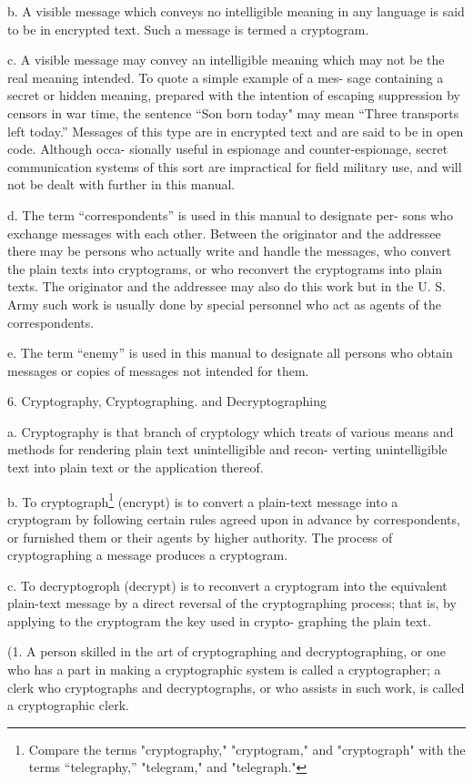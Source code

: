 b. A visible message which conveys no intelligible meaning in any
language is said to be in encrypted text. Such a message is termed a
cryptogram.

c. A visible message may convey an intelligible meaning which may
not be the real meaning intended. To quote a simple example of a mes-
sage containing a secret or hidden meaning, prepared with the intention
of escaping suppression by censors in war time, the sentence “Son born
today" may mean “Three transports left today.” Messages of this type
are in encrypted text and are said to be in open code. Although occa-
sionally useful in espionage and counter-espionage, secret communication
systems of this sort are impractical for ﬁeld military use, and will not
be dealt with further in this manual.

d. The term “correspondents” is used in this manual to designate per-
sons who exchange messages with each other. Between the originator
and the addressee there may be persons who actually write and handle
the messages, who convert the plain texts into cryptograms, or who
reconvert the cryptograms into plain texts. The originator and the
addressee may also do this work but in the U. S. Army such work is
usually done by special personnel who act as agents of the correspondents.

e. The term “enemy” is used in this manual to designate all persons
who obtain messages or copies of messages not intended for them.

6. Cryptography, Cryptographing. and Decryptographing

a. Cryptography is that branch of cryptology which treats of various
means and methods for rendering plain text unintelligible and recon-
verting unintelligible text into plain text or the application thereof.

b. To cryptograph\footnote{ Compare the terms "cryptography," "cryptogram," and "cryptograph" with the terms “telegraphy,” "telegram," and "telegraph."} (encrypt) is to convert a plain-text message into
a cryptogram by following certain rules agreed upon in advance by
correspondents, or furnished them or their agents by higher authority.
The process of cryptographing a message produces a cryptogram.

c. To decryptogroph (decrypt) is to reconvert a cryptogram into the
equivalent plain-text message by a direct reversal of the cryptographing
process; that is, by applying to the cryptogram the key used in crypto-
graphing the plain text.

(1. A person skilled in the art of cryptographing and decryptographing,
or one who has a part in making a cryptographic system is called a
cryptographer; a clerk who cryptographs and decryptographs, or who
assists in such work, is called a cryptographic clerk.

